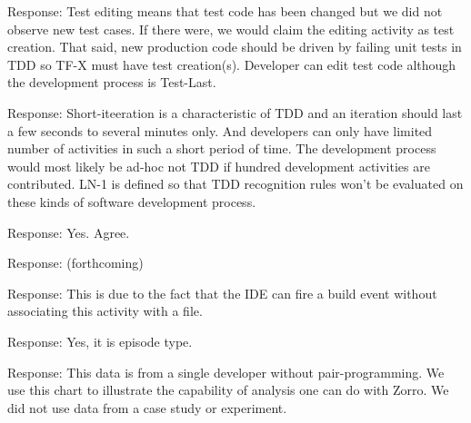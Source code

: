 \documentclass[11pt]{article}
\begin{document}

\noindent Response: Test editing means that test code has been changed but we
did not observe new test cases. If there were, we would claim the editing activity as test creation.  That said, new production code should be driven by failing unit tests in TDD so TF-X must have test creation(s). Developer can edit test code although the development process is Test-Last. 


\noindent Response: Short-iteeration is a characteristic of TDD and an iteration should last a few seconds to several minutes only. And developers can only have limited number of activities in such a short period of time. The development process would most likely be ad-hoc not TDD if hundred development activities are contributed. LN-1 is defined so that TDD recognition rules won't be evaluated on these kinds of software development process.


\noindent Response: Yes. Agree.


\noindent Response: (forthcoming)


\noindent Response: This is due to the fact that the IDE can fire a build event without associating this activity with a file. 


\noindent Response: Yes, it is episode type. 


\noindent Response: This data is from a single developer without pair-programming. We use this chart to illustrate the capability of analysis one can do with Zorro. We did not use data from a case study or experiment. 
\end{document}
